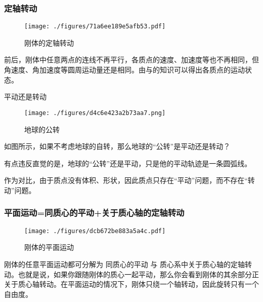 \subsubsection{定轴转动}
\begin{figure}[ht]
\centering
\texttt{[image: ./figures/71a6ee189e5afb53.pdf]}
\caption{刚体的定轴转动} \label{fig_RGAB_2}
\end{figure}
 前后，刚体中任意两点的连线不再平行，各质点的速度、加速度等也不再相同，但角速度、角加速度等圆周运动量还是相同。由与的知识可以得出各质点的运动状态。

\begin{example}{平动还是转动}
\begin{figure}[ht]
\centering
\texttt{[image: ./figures/d4c6e423a2b73aa7.png]}
\caption{地球的公转} \label{fig_RGAB_4}
\end{figure}
如图所示，如果不考虑地球的自转，那么地球的“公转”是平动还是转动？

有点违反直觉的是，地球的“公转”还是平动，只是他的平动轨迹是一条圆弧线。
\end{example}
作为对比，由于质点没有体积、形状，因此质点只存在“平动”问题，而不存在“转动”问题。

\subsubsection{平面运动=同质心的平动+关于质心轴的定轴转动}
\begin{figure}[ht]
\centering
\texttt{[image: ./figures/dcb672be883a5a4c.pdf]}
\caption{刚体的平面运动} \label{fig_RGAB_3}
\end{figure}
刚体的任意平面运动都可分解为 同质心的平动 与 质心系中关于质心轴的定轴转动。也就是说，如果你跟随刚体的质心一起平动，那么你会看到刚体的其余部分正关于质心轴转动。在平面运动的情况下，刚体只绕一个轴转动，因此旋转只有一个自由度。


